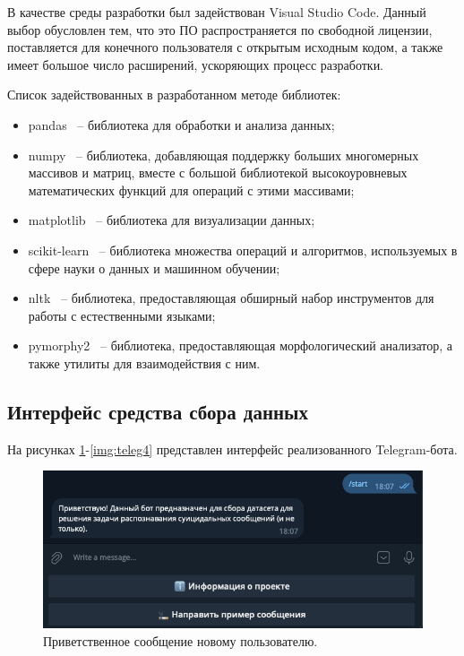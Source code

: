 В качестве среды разработки был задействован Visual Studio Code. Данный выбор обусловлен тем, что это ПО распространяется по свободной лицензии, поставляется для конечного пользователя с открытым исходным кодом, а также имеет большое число расширений, ускоряющих процесс разработки.

Список задействованных в разработанном методе библиотек:
\begin{itemize}
	\item pandas~\cite{pandas} -- библиотека для обработки и анализа данных;
	\item numpy~\cite{numpy} -- библиотека, добавляющая поддержку больших многомерных массивов и матриц, вместе с большой библиотекой высокоуровневых математических функций для операций с этими массивами;
	\item matplotlib~\cite{matplotlib} -- библиотека для визуализации данных;
	\item scikit-learn~\cite{sklearn} -- библиотека множества операций и алгоритмов, используемых в сфере науки о данных и машинном обучении;
	\item nltk~\cite{nltk} -- библиотека, предоставляющая обширный набор инструментов для работы с естественными языками;
	\item pymorphy2~\cite{pymorphy} -- библиотека, предоставляющая морфологический анализатор, а также утилиты для взаимодействия с ним.
\end{itemize}

\subsection{Интерфейс средства сбора данных}

На рисунках \ref{img:teleg1}-\ref{img:teleg4} представлен интерфейс реализованного Telegram-бота.

\begin{figure}[H]
	\centering
	\includegraphics[width=\textwidth]{inc/teleg1.png}
	\caption{ Приветственное сообщение новому пользователю. }
	\label{img:teleg1}
\end{figure}

